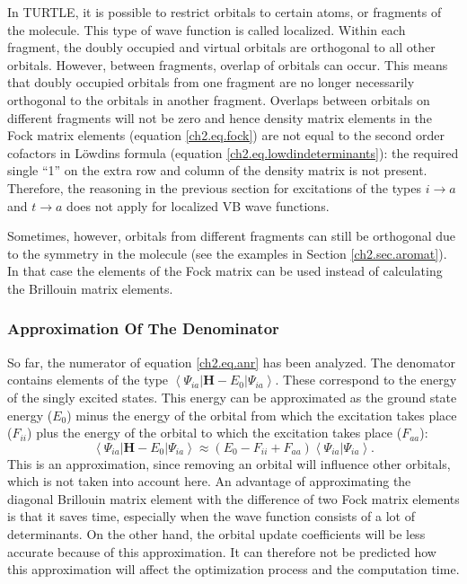 In TURTLE, it is possible to restrict orbitals to certain atoms, or fragments of the molecule. This type of wave function is called localized. Within each fragment, the doubly occupied and virtual orbitals are orthogonal to all other orbitals. However, between fragments, overlap of orbitals can occur. This means that doubly occupied orbitals from one fragment are no longer necessarily orthogonal to the orbitals in another fragment. Overlaps between orbitals on different fragments will not be zero and hence density matrix elements in the Fock matrix elements (equation \ref{ch2.eq.fock}) are not equal to the second order cofactors in L\"{o}wdins formula (equation \ref{ch2.eq.lowdindeterminants}): the required single ``1'' on the extra row and column of the density matrix is not present. Therefore, the reasoning in the previous section for excitations of the types $i \rightarrow a$ and $t \rightarrow a$ does not apply for localized VB wave functions. 

Sometimes, however, orbitals from different fragments can still be orthogonal due to the symmetry in the molecule (see the examples in Section \ref{ch2.sec.aromat}). In that case the elements of the Fock matrix can be used instead of calculating the Brillouin matrix elements.

\subsubsection{\label{ch2.sec.denominator}Approximation Of The Denominator}

So far, the numerator of equation \ref{ch2.eq.anr} has been analyzed. The denomator contains elements of the type $\left< \Psi_{ia} | \mathbf{H}-E_0 | \Psi_{ia} \right>$. These correspond to the energy of the singly excited states. This energy can be approximated as the ground state energy ($E_0$) minus the energy of the orbital from which the excitation takes place ($F_{ii}$) plus the energy of the orbital to which the excitation takes place ($F_{aa}$):
\begin{equation}
\left< \Psi_{ia} | \mathbf{H}-E_0 | \Psi_{ia} \right> \approx (E_0 - F_{ii} + F_{aa})\left< \Psi_{ia} | \Psi_{ia} \right>.
\label{ch2.eq.cheapdiag}
\end{equation}
This is an approximation, since removing an orbital will influence other orbitals, which is not taken into account here. An advantage of approximating the diagonal Brillouin matrix element with the difference of two Fock matrix elements is that it saves time, especially when the wave function consists of a lot of determinants. On the other hand, the orbital update coefficients will be less accurate because of this approximation. It can therefore not be predicted how this approximation will affect the optimization process and the computation time.

